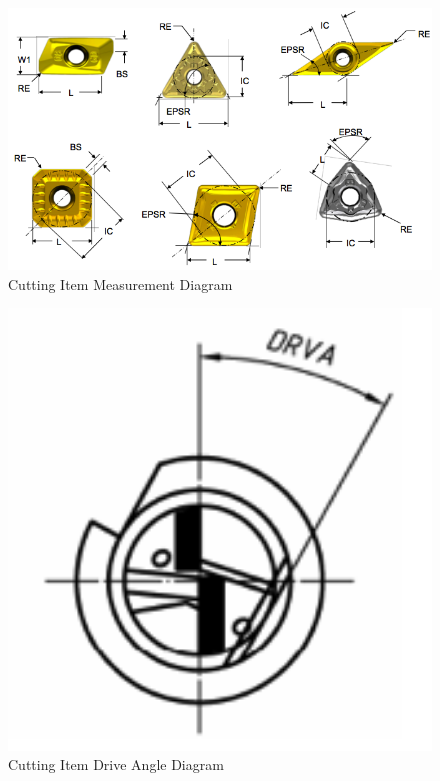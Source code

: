 \FloatBarrier


\begin{figure}[ht]
  \centering
    \includegraphics[width=1.0\textwidth]{figures/Cutting Item Measurement.png}
  \caption{Cutting Item Measurement Diagram}
  \label{fig:Cutting Item Measurement Diagram}
\end{figure}

\FloatBarrier


\begin{figure}[ht]
  \centering
    \includegraphics[width=1.0\textwidth]{figures/Cutting Item Drive Angle.png}
  \caption{Cutting Item Drive Angle Diagram}
  \label{fig:Cutting Item Drive Angle Diagram}
\end{figure}

